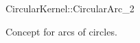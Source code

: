 \begin{ccRefConcept}{CircularKernel::CircularArc_2}

Concept for arcs of circles.

\ccHasModels
{}
\end{ccRefConcept}
